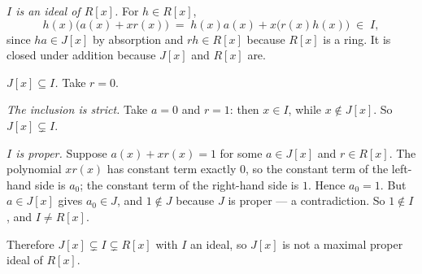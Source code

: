 \documentclass[11pt]{article}
\begin{document}
\begin{solution}
  \emph{$I$ is an ideal of $R[x]$.} For $h \in R[x]$,
  \[
    h(x)\bigl(a(x) + x r(x)\bigr) \;=\; h(x) a(x) + x\bigl(r(x) h(x)\bigr)
      \;\in\; I,
  \]
  since $h a \in J[x]$ by absorption and $r h \in R[x]$ because $R[x]$ is a
  ring. It is closed under addition because $J[x]$ and $R[x]$ are.

  \emph{$J[x] \subseteq I$.} Take $r = 0$.

  \emph{The inclusion is strict.} Take $a = 0$ and $r = 1$: then $x \in I$,
  while $x \notin J[x]$. So $J[x] \subsetneq I$.

  \emph{$I$ is proper.} Suppose $a(x) + x r(x) = 1$ for some $a \in J[x]$ and
  $r \in R[x]$. The polynomial $x r(x)$ has constant term exactly $0$, so the
  constant term of the left-hand side is $a_{0}$; the constant term of the
  right-hand side is $1$. Hence $a_{0} = 1$. But $a \in J[x]$ gives
  $a_{0} \in J$, and $1 \notin J$ because $J$ is proper --- a contradiction.
  So $1 \notin I$, and $I \neq R[x]$.

  Therefore $J[x] \subsetneq I \subsetneq R[x]$ with $I$ an ideal, so $J[x]$ is
  not a maximal proper ideal of $R[x]$.
\end{solution}
\end{document}
